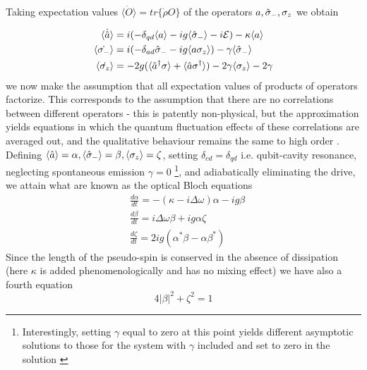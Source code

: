 Taking expectation values $\langle \dot{O} \rangle = tr\{\dot{\rho} O \}$ of the operators $a, \hat{\sigma}_-, \sigma_z$ we obtain

\begin{align}
  \langle \dot{\hat{a}} \rangle & = i(-\delta_{qd}\langle a \rangle - ig \langle \hat{\sigma}_- \rangle -i\mathcal{E}) -\kappa \langle a \rangle \\
  \langle \dot{\sigma_-} \rangle & = i(-\delta_{ad}\hat{\sigma}_- - ig \langle a \sigma_z \rangle) - \gamma \langle \hat{\sigma}_- \rangle \\
  \langle \dot{\sigma_z} \rangle & = -2g ( \langle \hat{a}^\dagger \sigma \rangle + \langle \hat{a} \sigma^\dagger \rangle) - 2 \gamma \langle \sigma_z \rangle - 2 \gamma
\end{align}
we now make the assumption that all expectation values of products of operators factorize. This corresponds to the assumption that there are no correlations between different operators - this is patently non-physical, but the approximation yields equations in which the quantum fluctuation effects of these correlations are averaged out, and the qualitative behaviour remains the same to high order \cite{Jaynes1963a}. Defining $\langle \hat{a} \rangle = \alpha, \langle \hat{\sigma}_- \rangle = \beta, \langle \sigma_z \rangle = \zeta$, setting $\delta_{cd} = \delta_{qd}$ i.e. qubit-cavity resonance, neglecting spontaneous emission $\gamma=0$ \footnote{ Interestingly, setting $\gamma$ equal to zero at this point yields different asymptotic solutions to those for the system with $\gamma$ included and set to zero in the solution \cite{Carmichael2015}}, and adiabatically eliminating the drive, we attain what are known as the optical Bloch equations
\begin{align}
  &\frac{d \alpha}{dt} = -(\kappa -i \Delta \omega) \alpha-ig \beta \label{eq:alpha}\\
  &\frac{d \beta}{dt} = i \Delta \omega \beta +ig \alpha \zeta \label{eq:beta}\\
  &\frac{d \zeta}{dt} = 2 i g(\alpha^* \beta -\alpha \beta^*)\label{eq:zeta}
\end{align}
Since the length of the pseudo-spin is conserved in the absence of dissipation (here $\kappa$ is added phenomenologically and has no mixing effect) we have also a fourth equation
\begin{equation}
  4|\beta|^2+\zeta^2 = 1 \label{eq:pseudospin}
\end{equation}
